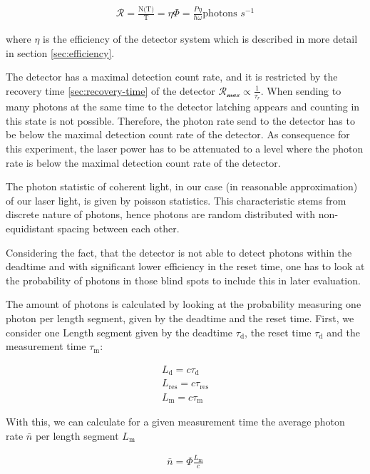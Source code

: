 \begin{align}
    \mathcal{R} = \frac{\text{N(T)}}{\text{T}} = \eta \Phi= \frac{P \eta}{\hbar \omega} \text{photons  $s^{-1}$}
\end{align}

where \textit{$\eta$} is the efficiency of the detector system which is described in more detail in section \ref{sec:efficiency}.

The detector has a maximal detection count rate, and it is restricted by the recovery time \ref{sec:recovery-time} of the detector
$\mathcal{R_{\max}} \propto \frac{1}{\tau_{r}}$.
When sending to many photons at the same time to the detector latching appears \cite{single_quantum_scspcm} and counting
in this state is not possible.
Therefore, the photon rate send to the detector has to be below the maximal detection count rate of the detector.
As consequence for this experiment, the laser power has to be attenuated to a level where the photon rate is below the
maximal detection count rate of the detector.

The photon statistic of coherent light, in our case (in reasonable approximation) of our laser light,
is given by poisson statistics.
This characteristic stems from discrete nature of photons, hence photons are random distributed with non-equidistant
spacing between each other.

Considering the fact, that the detector is not able to detect photons within the deadtime and with significant lower efficiency
in the reset time, one has to look at the probability of photons in those blind spots to include this in later evaluation.

The amount of photons is calculated by looking at the probability measuring one photon per length segment, given by
the deadtime and the reset time.
First, we consider one Length segment given by the deadtime $\tau_{\text{d}}$, the reset time $\tau_{\text{d}}$ and
the measurement time $\tau_{\text{m}}$:

\begin{align}
    L_{\text{d}} = c \tau_{\text{d}} \\
    L_{\text{res}} = c \tau_{\text{res}} \\
    L_{\text{m}} = c\tau_{\text{m}}
\end{align}

With this, we can calculate for a given measurement time the average photon rate $\bar{n}$ per length segment $L_{\text{m}}$

\begin{align}
    \bar{n} = \Phi \frac{L_{\text{m}}}{c}\\
\end{align}

